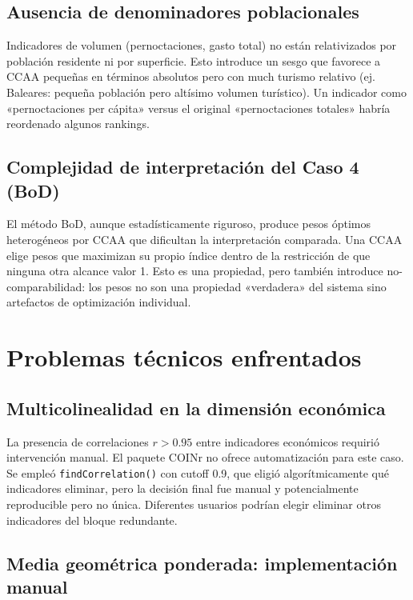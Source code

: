 \subsection{Ausencia de denominadores poblacionales}

Indicadores de volumen (pernoctaciones, gasto total) no están relativizados por población residente ni por superficie. Esto introduce un sesgo que favorece a CCAA pequeñas en términos absolutos pero con much turismo relativo (ej. Baleares: pequeña población pero altísimo volumen turístico). Un indicador como «pernoctaciones per cápita» versus el original «pernoctaciones totales» habría reordenado algunos rankings.

\subsection{Complejidad de interpretación del Caso 4 (BoD)}

El método BoD, aunque estadísticamente riguroso, produce pesos óptimos heterogéneos por CCAA que dificultan la interpretación comparada. Una CCAA elige pesos que maximizan su propio índice dentro de la restricción de que ninguna otra alcance valor 1. Esto es una propiedad, pero también introduce no-comparabilidad: los pesos no son una propiedad «verdadera» del sistema sino artefactos de optimización individual.

\section{Problemas técnicos enfrentados}

\subsection{Multicolinealidad en la dimensión económica}

La presencia de correlaciones $r > 0.95$ entre indicadores económicos requirió intervención manual. El paquete COINr no ofrece automatización para este caso. Se empleó \texttt{findCorrelation()} con cutoff 0.9, que eligió algorítmicamente qué indicadores eliminar, pero la decisión final fue manual y potencialmente reproducible pero no única. Diferentes usuarios podrían elegir eliminar otros indicadores del bloque redundante.

\subsection{Media geométrica ponderada: implementación manual}

